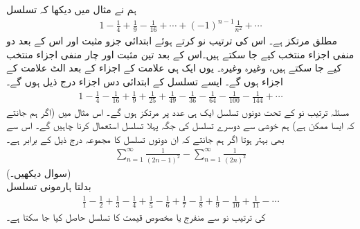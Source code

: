 ہم نے مثال  میں دیکھا کہ تسلسل
\begin{align*}
1-\frac{1}{4}+\frac{1}{9}-\frac{1}{16}+\cdots+(-1)^{n-1}\frac{1}{n^2}+\cdots
\end{align*}
مطلق مرتکز ہے۔ اس کی ترتیب نو کرتے ہوئے ابتدائی جزو مثبت اور اس  کے بعد دو منفی اجزاء منتخب کیے جا سکتے ہیں۔اس کے بعد تین مثبت اور چار منفی اجزاء  منتخب کیے جا سکتے ہیں، وغیرہ وغیرہ۔ یوں ایک ہی علامت کے  اجزاء کے بعد الٹ علامت کے  اجزاء ہوں گے۔ ایسے تسلسل کے ابتدائی دس اجزاء درج ذیل ہوں گے۔
\begin{align*}
1-\frac{1}{4}-\frac{1}{16}+\frac{1}{9}+\frac{1}{25}+\frac{1}{49}-\frac{1}{36}-\frac{1}{64}-\frac{1}{100}-\frac{1}{144}+\cdots
\end{align*}
مسئلہ ترتیب نو کے تحت دونوں تسلسل ایک ہی عدد پر مرتکز ہوں گے۔ اس مثال میں (اگر ہم جانتے کہ ایسا ممکن ہے) ہم خوشی سے دوسرے تسلسل کی جگہ پہلا تسلسل استعمال کرنا چاہیں گے۔ اس سے بھی بہتر ہوتا اگر ہم جانتے کہ ان دونوں تسلسل کا مجموعہ درج ذیل کے برابر ہے۔
\begin{align*}
\sum_{n=1}^{\infty}\frac{1}{(2n-1)^2}-\sum_{n=1}^{\infty}\frac{1}{(2n)^2}
\end{align*}
(سوال  دیکھیں۔)
\\
بدلتا ہارمونی تسلسل
\begin{align*}
\frac{1}{1}-\frac{1}{2}+\frac{1}{3}-\frac{1}{4}+\frac{1}{5}-\frac{1}{6}+\frac{1}{7}-\frac{1}{8}+\frac{1}{9}-\frac{1}{10}+\frac{1}{11}-\cdots
\end{align*}
کی ترتیب نو سے منفرج  یا مخصوص قیمت کا تسلسل حاصل کیا جا سکتا ہے۔
